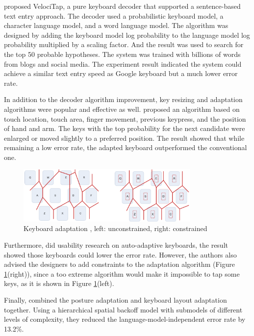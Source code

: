 \documentclass[11pt]{article}
\begin{document}
\citet{10.1145/2702123.2702135} proposed VelociTap, a pure keyboard decoder that supported a sentence-based text entry approach. The decoder used a probabilistic keyboard model, a character language model, and a word language model. The algorithm was designed by adding the keyboard model log probability to the language model log probability multiplied by a scaling factor. And the result was used to search for the top 50 probable hypotheses. The system was trained with billions of words from blogs and social media. The experiment result indicated the system could achieve a similar text entry speed as Google keyboard but a much lower error rate.

In addition to the decoder algorithm improvement, key resizing and adaptation algorithms were popular and effective as well. \citet{10.1145/2207676.2208520} proposed an algorithm based on touch location, touch area, finger movement, previous keypress, and the position of hand and arm. The keys with the top probability for the next candidate were enlarged or moved slightly to a preferred position. The result showed that while remaining a low error rate, the adapted keyboard outperformed the conventional one. 

\begin{figure}[H]
  \centering
  \includegraphics[width=0.8\textwidth]{Usability.png}
  \caption{Keyboard adaptation \citep{10.1145/1719970.1719986}, left: unconstrained, right: constrained}
  \label{fig:usability}
\end{figure}

Furthermore, \citet{10.1145/1719970.1719986} did usability research on auto-adaptive keyboards, the result showed those keyboards could lower the error rate. However, the authors also advised the designers to add constraints to the adaptation algorithm (Figure \ref{fig:usability}(right)), since a too extreme algorithm would make it impossible to tap some keys, as it is shown in Figure \ref{fig:usability}(left).

Finally, \citet{10.1145/2470654.2481384} combined the posture adaptation and keyboard layout adaptation together. Using a hierarchical spatial backoff model with submodels of different levels of complexity, they reduced the language-model-independent error rate by 13.2\%.
\end{document}
